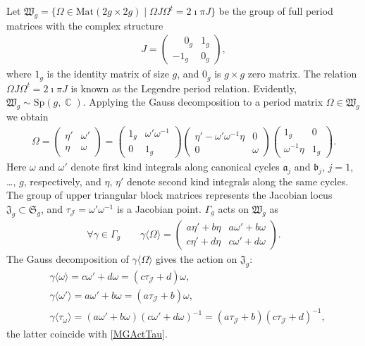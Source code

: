 \documentclass[twoside]{amsart}
\newcommand{\J}{\mathcal{J}}
\newcommand{\M}{\phantom{-}}
\newcommand{\Mat}{\mathrm{Mat}}
\DeclareMathOperator{\Complex}{\mathbb{C}}
\theoremstyle{definition}
\theoremstyle{plain}
\begin{document}
Let $\mathfrak{W}_g  = \{\Omega \in \Mat(2g \times 2g) \mid 
\Omega J \Omega^t = 2 \imath \pi J\}$ be the group of
full period matrices with
the complex structure
\begin{gather*}
J = \left( \begin{array}{cc}  \M 0_g & 1_g \\ -1_g & 0_g
\end{array}  \right),
\end{gather*}
where $1_g$ is the identity matrix of size $g$, and $0_g$ is $g\times g$ zero matrix.
The relation $\Omega J \Omega^t = 2 \imath \pi J$ is known as the Legendre period relation.
Evidently, $\mathfrak{W}_g \sim  \mathrm{Sp}(g,\Complex)$.
Applying the Gauss decomposition to a period matrix $\Omega \in \mathfrak{W}_g$
we obtain 
\begin{gather}\label{OMatr}
\Omega = 
\begin{pmatrix} \eta' & \omega' \\ \eta & \omega \end{pmatrix}
= \begin{pmatrix} 1_g & \omega' \omega^{-1} \\ 0 & 1_g \end{pmatrix}
\begin{pmatrix} \eta' - \omega' \omega^{-1} \eta & 0 \\ 0 & \omega \end{pmatrix}
\begin{pmatrix} 1_g & 0 \\ \omega^{-1}  \eta & 1_g \end{pmatrix}.
\end{gather}
Here $\omega$ and $\omega'$ denote first kind integrals along canonical cycles
$\mathfrak{a}_j$ and $\mathfrak{b}_j$, $j=1$, \ldots, $g$, respectively, and 
$\eta$, $\eta'$ denote second kind integrals along the same  cycles.
The group of upper triangular block matrices represents the Jacobian locus
$\mathfrak{J}_g \subset \mathfrak{S}_g$,
and $\tau_{\J} = \omega' \omega^{-1}$ is a Jacobian point.
$\Gamma_g$ acts on $\mathfrak{W}_g$ as
\begin{gather*} 
\forall \gamma \in  \Gamma_g \qquad
 \gamma \langle \Omega \rangle =  
 \begin{pmatrix} a \eta' + b \eta & a \omega' + b \omega \\ 
c \eta' + d \eta & c \omega' + d \omega \end{pmatrix}.
\end{gather*}
The Gauss decomposition of $ \gamma \langle \Omega \rangle$ gives
the action on $\mathfrak{J}_g$:
\begin{subequations}\label{GammaTau}
\begin{align}
&\gamma \langle \omega \rangle = c \omega' + d \omega = (c \tau_\J + d) \omega, \\
&\gamma \langle \omega' \rangle =  a \omega' + b \omega =   (a \tau_\J + b) \omega, \\
&\gamma \langle \tau_\omega \rangle = (a \omega' + b \omega) (c \omega' + d \omega)^{-1}
= (a \tau_\J + b) (c \tau_\J + d)^{-1},
\end{align}
\end{subequations}
the latter coincide with \eqref{MGActTau}. 
\end{document}
